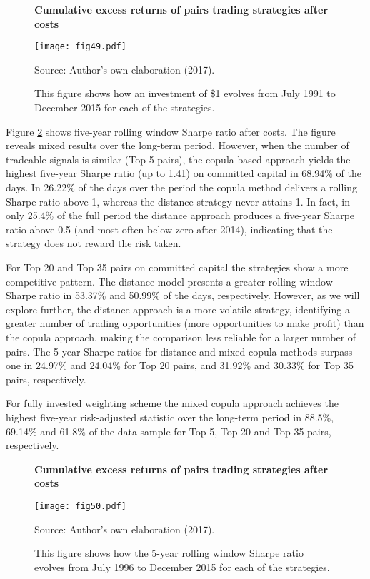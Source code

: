 \documentclass[a4paper,12pt]{report}
\begin{document}
\begin{refsection}
	\begin{figure}[H]
		\centering
		\caption{\textbf{Cumulative excess returns of pairs trading strategies after costs}}
		\texttt{[image: fig49.pdf]}
		\captionsetup{justification=raggedright,
			singlelinecheck=false
		}
		\caption*{Source: Author's own elaboration (2017).}
		\caption*{\scriptsize This figure shows how an investment of \$1 evolves from July 1991 to December 2015 for each of the strategies.}
		\label{fig:fig49}
	\end{figure}
	
	Figure \ref{fig:fig50} shows five-year rolling window Sharpe ratio after costs. The figure reveals mixed results over the long-term period. However, when the number of tradeable signals is similar (Top 5 pairs), the copula-based approach yields the highest five-year Sharpe ratio (up to 1.41) on committed capital in 68.94\% of the days. In 26.22\% of the days over the period the copula method delivers a rolling Sharpe ratio above 1, whereas the distance strategy never attains 1. In fact, in only 25.4\% of the full period the distance approach produces a five-year Sharpe ratio above 0.5 (and most often below zero after 2014), indicating that the strategy does not reward the risk taken.
	
	For Top 20 and Top 35 pairs on committed capital the strategies show a more competitive pattern. The distance model presents a greater rolling window Sharpe ratio in 53.37\% and 50.99\% of the days, respectively. However, as we will explore further, the distance approach is a more volatile strategy, identifying a greater number of trading opportunities (more opportunities to make profit) than the copula approach, making the comparison less reliable for a larger number of pairs. The 5-year Sharpe ratios for distance and mixed copula methods surpass one in 24.97\% and 24.04\% for Top 20 pairs, and 31.92\% and 30.33\% for Top 35 pairs, respectively.
	
	For fully invested weighting scheme the mixed copula approach achieves the highest five-year risk-adjusted statistic over the long-term period in 88.5\%, 69.14\% and 61.8\% of the data sample for Top 5, Top 20 and Top 35 pairs, respectively.
	
	
	\begin{figure}[H]
		\centering
		\caption{\textbf{Cumulative excess returns of pairs trading strategies after costs}}
		\texttt{[image: fig50.pdf]}
		\captionsetup{justification=raggedright,
			singlelinecheck=false
		}
		\caption*{Source: Author's own elaboration (2017).}
		\caption*{\scriptsize This figure shows how the 5-year rolling window Sharpe ratio evolves from July 1996 to December 2015 for each of the strategies.}
		\label{fig:fig50}
	\end{figure}
	

\end{refsection}
\end{document}
